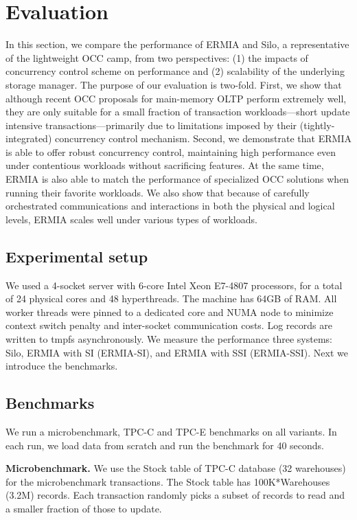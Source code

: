 
\section{Evaluation}
In this section, we compare the performance of ERMIA and Silo, a representative of the lightweight OCC camp, from two perspectives: (1) the impacts of concurrency control scheme on performance and (2) scalability of the underlying storage manager. The purpose of our evaluation is two-fold. First, we show that although recent OCC proposals for main-memory OLTP perform extremely well, they are only suitable for a small fraction of transaction workloads---short update intensive transactions---primarily due to limitations imposed by their (tightly-integrated) concurrency control mechanism. Second, we demonstrate that ERMIA is able to offer robust concurrency control, maintaining high performance even under contentious workloads without sacrificing features. At the same time, ERMIA is also able to match the performance of specialized OCC solutions when running their favorite workloads. We also show that because of carefully orchestrated communications and interactions in both the physical and logical levels, ERMIA scales well under various types of workloads.

\subsection{Experimental setup}
We used a 4-socket server with 6-core Intel Xeon E7-4807 processors, for a total of 24 physical cores and 48 hyperthreads. The machine has 64GB of RAM. All worker threads were pinned to a dedicated core and NUMA node to minimize context switch penalty and inter-socket communication costs. Log records are written to tmpfs asynchronously. We measure the performance three systems: Silo, ERMIA with SI (ERMIA-SI), and ERMIA with SSI (ERMIA-SSI). Next we introduce the benchmarks.

\subsection{Benchmarks}
We run a microbenchmark, TPC-C and TPC-E benchmarks on all variants. In each run, we load data from scratch and run the benchmark for 40 seconds.

\textbf{Microbenchmark.}
We use the Stock table of TPC-C database (32 warehouses) for the microbenchmark transactions. The Stock table has 100K*Warehouses (3.2M) records. Each transaction randomly picks a subset of records to read and a smaller fraction of those to update.

